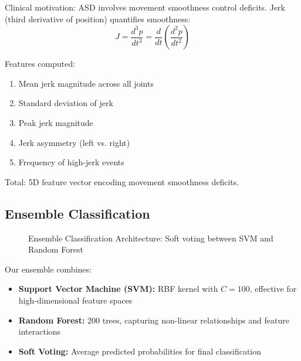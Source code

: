\documentclass[conference]{IEEEtran}
\begin{document}
Clinical motivation: ASD involves movement smoothness control deficits. Jerk (third derivative of position) quantifies smoothness:
\begin{equation}
J = \frac{d^3p}{dt^3} = \frac{d}{dt}\left(\frac{d^2p}{dt^2}\right)
\end{equation}

Features computed:
\begin{enumerate}
\item Mean jerk magnitude across all joints
\item Standard deviation of jerk
\item Peak jerk magnitude
\item Jerk asymmetry (left vs. right)
\item Frequency of high-jerk events
\end{enumerate}

Total: 5D feature vector encoding movement smoothness deficits.

\subsection{Ensemble Classification}

\begin{figure}[H]
\centering
{}
\caption{Ensemble Classification Architecture: Soft voting between SVM and Random Forest}
\label{fig:ensemble_arch}
\end{figure}

Our ensemble combines:
\begin{itemize}
\item \textbf{Support Vector Machine (SVM):} RBF kernel with $C=100$, effective for high-dimensional feature spaces
\item \textbf{Random Forest:} 200 trees, capturing non-linear relationships and feature interactions
\item \textbf{Soft Voting:} Average predicted probabilities for final classification
\end{itemize}
\end{document}
